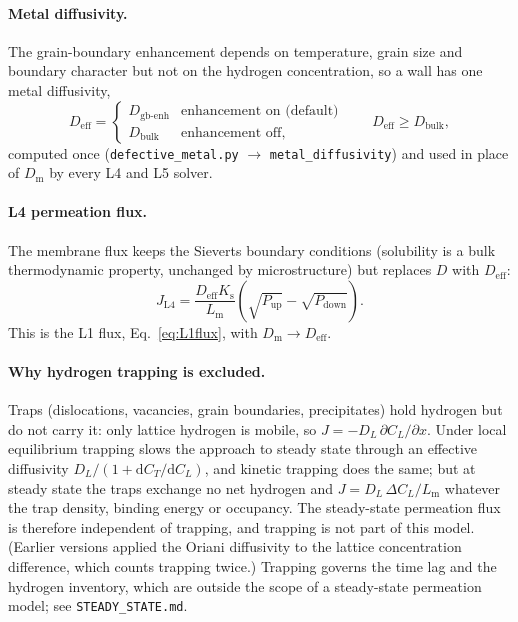 \documentclass[11pt,a4paper]{article}
\newcommand{\Pup}{P_{\mathrm{up}}}
\newcommand{\Pdown}{P_{\mathrm{down}}}
\newcommand{\Ks}{K_{\mathrm{s}}}
\newcommand{\Dm}{D_{\mathrm{m}}}
\newcommand{\Deff}{D_{\mathrm{eff}}}
\newcommand{\Lm}{L_{\mathrm{m}}}
\newcommand{\code}[1]{\texttt{#1}}
\begin{document}
\paragraph{Metal diffusivity.} The grain-boundary enhancement depends on
temperature, grain size and boundary character but not on the hydrogen
concentration, so a wall has one metal diffusivity,
\begin{equation}
  \Deff = \begin{cases} D_{\mathrm{gb\text{-}enh}} & \text{enhancement on (default)}\\
                       D_{\mathrm{bulk}} & \text{enhancement off,} \end{cases}
  \qquad \Deff \ge D_{\mathrm{bulk}},
  \label{eq:metalD}
\end{equation}
computed once (\code{defective\_metal.py} $\rightarrow$ \code{metal\_diffusivity}) and
used in place of $\Dm$ by every L4 and L5 solver.

\paragraph{L4 permeation flux.} The membrane flux keeps the Sieverts boundary
conditions (solubility is a bulk thermodynamic property, unchanged by
microstructure) but replaces $D$ with $\Deff$:
\begin{equation}
  J_{\mathrm{L4}} = \frac{\Deff \Ks}{\Lm}\left(\sqrt{\Pup} - \sqrt{\Pdown}\right).
  \label{eq:L4flux}
\end{equation}
This is the L1 flux, Eq.~\eqref{eq:L1flux}, with $\Dm \rightarrow \Deff$.

\paragraph{Why hydrogen trapping is excluded.} Traps (dislocations, vacancies,
grain boundaries, precipitates) hold hydrogen but do not carry it: only lattice
hydrogen is mobile, so $J = -D_L\,\partial C_L/\partial x$. Under local equilibrium
\citep{oriani1970} trapping slows the approach to steady state through an effective
diffusivity $D_L/(1 + \mathrm{d}C_T/\mathrm{d}C_L)$, and kinetic trapping
\citep{mcnabb1963} does the same; but at steady state the traps exchange no net
hydrogen and $J = D_L\,\Delta C_L/\Lm$ whatever the trap density, binding energy or
occupancy. The steady-state permeation flux is therefore independent of trapping,
and trapping is not part of this model. (Earlier versions applied the Oriani
diffusivity to the lattice concentration difference, which counts trapping twice.)
Trapping governs the time lag and the hydrogen inventory, which are outside the
scope of a steady-state permeation model; see \code{STEADY\_STATE.md}.
\end{document}

